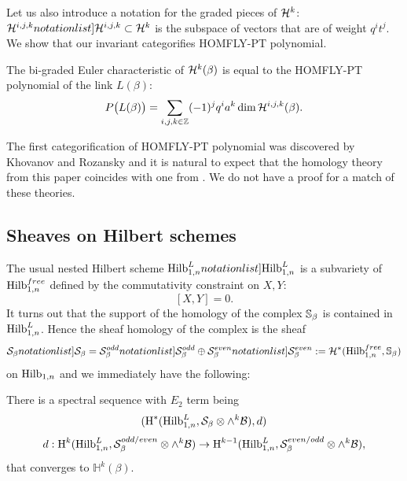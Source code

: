 \documentclass[10pt]{amsart}
\def\ZZ{\mathbb{Z} }
\begin{document}
Let us also introduce a notation for the graded pieces of $\mathcal{H}^k$: $\SymbolPrint{\calH^{i,j,k}}\subset \calH^k$ is the subspace of vectors that are of weight
$q^it^j$.
We show that our invariant categorifies HOMFLY-PT polynomial.


\def\Hvv#1{ \calH^{#1}}
\def\Hijk{ \Hvv{i,j,k}}

\begin{theorem}\label{thm:HOMFLY}
The bi-graded Euler characteristic of $\mathcal{H}^k(\beta)$ is equal to the HOMFLY-PT polynomial of the link $L(\beta)$:
\def\Phmf{P}
\[
\Phmf\bigl(L(\beta)\bigr) =\sum_{i,j,k\in\ZZ} (-1)^j q^i a^k\dim\Hijk(\beta).
\]
\end{theorem}



The first categorification of HOMFLY-PT polynomial was discovered by Khovanov and Rozansky \cite{KhR} and it is natural to expect that the homology
theory from this paper coincides with one from \cite{KhR}. We do not have a proof for a match of these theories.

\subsection{Sheaves on Hilbert schemes}
The usual nested Hilbert scheme $\SymbolPrint{\Hilb^L_{1,n}}$
is a subvariety of $\mathrm{Hilb}_{1,n}^{free}$ defined by the commutativity constraint on $X,Y$:
\[ [X,Y]=0.\]
It turns out that the support of the homology of the complex $\mathbb{S}_\beta$ is contained in $\mathrm{Hilb}_{1,n}^L$. Hence the sheaf homology of the complex is the  sheaf
\[\SymbolPrint{\calS_\beta}=\SymbolPrint{\calS_\beta^{odd}}\oplus\SymbolPrint{\calS_\beta^{even}}:=\mathcal{H}^*(\Hilb_{1,n}^{free},\mathbb{S}_\beta)\] on $\mathrm{Hilb}_{1,n}$ and we immediately have the following:
\begin{theorem}\label{thm: spec seq}
There is a spectral sequence with $E_2$ term being
$$ (\textup{H}^*(\mathrm{Hilb}^L_{1,n},\mathcal{S}_\beta\otimes\wedge^k\mathcal{B}),d)$$
$$
d: \textup{H}^k(\mathrm{Hilb}^L_{1,n},\mathcal{S}^{odd/even}_\beta\otimes\wedge^k\mathcal{B})\to
\textup{H}^{k-1}(\mathrm{Hilb}^L_{1,n},\mathcal{S}^{even/odd}_\beta\otimes\wedge^k\mathcal{B}),$$
that converges to $\mathbb{H}^k(\beta)$.
\end{theorem}
\end{document}
